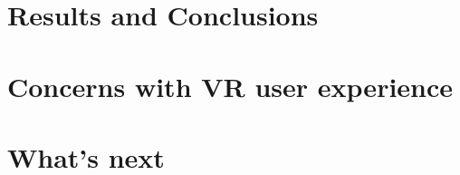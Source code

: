 \documentclass{article}
\begin{document}

\section{Results and Conclusions}


\section{Concerns with VR user experience }


\section{What's next}

\end{document}
